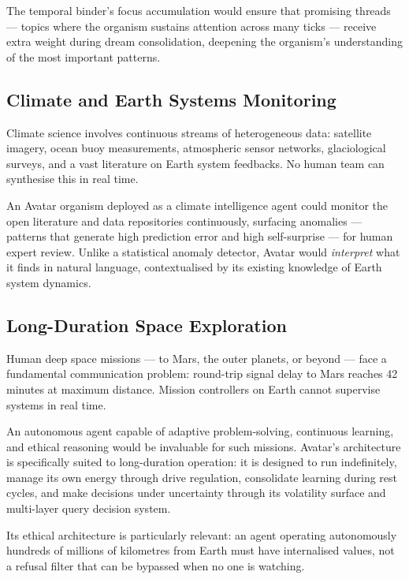\documentclass[11pt,a4paper]{article}
\begin{document}
The temporal binder's focus accumulation would ensure that promising threads --- topics
where the organism sustains attention across many ticks --- receive extra weight during
dream consolidation, deepening the organism's understanding of the most important
patterns.

\subsection{Climate and Earth Systems Monitoring}

Climate science involves continuous streams of heterogeneous data: satellite imagery,
ocean buoy measurements, atmospheric sensor networks, glaciological surveys, and a vast
literature on Earth system feedbacks. No human team can synthesise this in real time.

An Avatar organism deployed as a climate intelligence agent could monitor the open
literature and data repositories continuously, surfacing anomalies --- patterns that
generate high prediction error and high self-surprise --- for human expert review.
Unlike a statistical anomaly detector, Avatar would \emph{interpret} what it finds in
natural language, contextualised by its existing knowledge of Earth system dynamics.

\subsection{Long-Duration Space Exploration}

Human deep space missions --- to Mars, the outer planets, or beyond --- face a
fundamental communication problem: round-trip signal delay to Mars reaches 42 minutes
at maximum distance. Mission controllers on Earth cannot supervise systems in real time.

An autonomous agent capable of adaptive problem-solving, continuous learning, and ethical
reasoning would be invaluable for such missions. Avatar's architecture is specifically
suited to long-duration operation: it is designed to run indefinitely, manage its own
energy through drive regulation, consolidate learning during rest cycles, and make
decisions under uncertainty through its volatility surface and multi-layer query
decision system.

Its ethical architecture is particularly relevant: an agent operating autonomously
hundreds of millions of kilometres from Earth must have internalised values, not a refusal
filter that can be bypassed when no one is watching.
\end{document}
